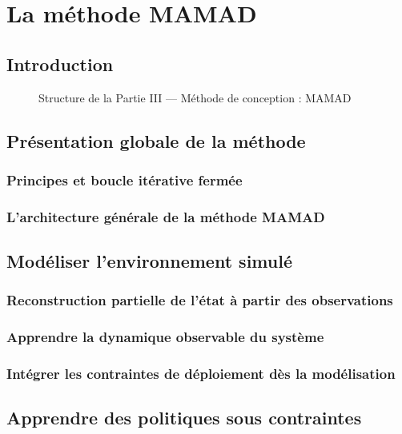 \documentclass[ twoside,openright,titlepage,numbers=noenddot,headinclude,%
                footinclude=true,cleardoublepage=empty,abstractoff, %
                BCOR=5mm,paper=a4,fontsize=11pt,%
                french,american,%
                ]{scrreprt}
\begin{document}
\part{La méthode MAMAD}

\chapter*{Introduction}

\begin{figure}[h!]
    \centering
    
    \caption{Structure de la Partie III — Méthode de conception : MAMAD}
\end{figure}

\chapter{Présentation globale de la méthode}

\section{Principes et boucle itérative fermée}

\section{L'architecture générale de la méthode MAMAD}

\chapter{Modéliser l'environnement simulé}
\section{Reconstruction partielle de l'état à partir des observations}
\section{Apprendre la dynamique observable du système}
\section{Intégrer les contraintes de déploiement dès la modélisation}

\chapter{Apprendre des politiques sous contraintes}
\end{document}

